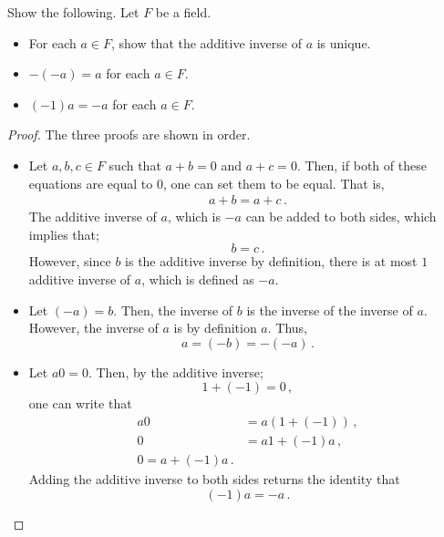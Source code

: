 \begin{problem}\label{prob:0p3}
    Show the following. Let $F$ be a field. 
    \begin{itemize}
        \item For each $a \in F$, show that the additive inverse of $a$ is unique.
        \item $-(-a) = a$ for each $a \in F$.
        \item $(-1)a = -a$ for each $a \in F$. 
    \end{itemize}
\end{problem}
\begin{proof}
    The three proofs are shown in order.
    \begin{itemize}
        \item Let $a,b,c \in F$ such that $a + b = 0$ and $a + c = 0$. Then, if both of these equations are equal to 0, one can set them to be equal. That is,
        \begin{align*}
            a + b = a + c\,.
        \end{align*}
        The additive inverse of $a$, which is $-a$ can be added to both sides, which implies that;
        \begin{equation*}
            b = c\,.
        \end{equation*}
        However, since $b$ is the additive inverse by definition, there is at most $1$ additive inverse of $a$, which is defined as $-a$. 
        \item Let $(-a) = b$. Then, the inverse of $b$ is the inverse of the inverse of $a$. However, the inverse of $a$ is by definition $a$. Thus, 
        \begin{equation*}
            a = (-b) = -(-a)\,.
        \end{equation*}
        \item Let $a0 = 0$. Then, by the additive inverse;
        \begin{equation*}
            1 + (-1) = 0\,,
        \end{equation*}
        one can write that
        \begin{align*}
            a0 &= a(1 + (-1))\,,\\
            0 &= a1 + (-1)a\,, \\
            0 = a + (-1)a\,.
        \end{align*}
        Adding the additive inverse to both sides returns the identity that
        \begin{equation*}
            (-1)a = -a\,.
        \end{equation*}
    \end{itemize}
\end{proof}
